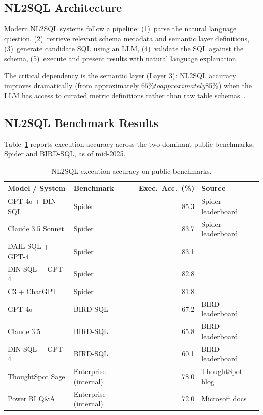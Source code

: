 \documentclass[12pt, a4paper]{article}
\begin{document}
\subsection{NL2SQL Architecture}
Modern NL2SQL systems follow a pipeline: (1)~parse the natural language question, (2)~retrieve relevant schema metadata and semantic layer definitions, (3)~generate candidate SQL using an LLM, (4)~validate the SQL against the schema, (5)~execute and present results with natural language explanation.

The critical dependency is the semantic layer (Layer 3): NL2SQL accuracy improves dramatically (from approximately $65\% to approximately $85\%) when the LLM has access to curated metric definitions rather than raw table schemas~\citep{gartner2024augmented}.

\subsection{NL2SQL Benchmark Results}
Table~\ref{tab:nl2sql-benchmarks} reports execution accuracy across the two dominant public benchmarks, Spider and BIRD-SQL, as of mid-2025.

\begin{table}[ht]
\centering\small
\caption{NL2SQL execution accuracy on public benchmarks.}
\label{tab:nl2sql-benchmarks}
\begin{tabular}{>{\raggedright\arraybackslash}p{4.2cm} l r >{\raggedright\arraybackslash}p{3.8cm}}
\toprule
\textbf{Model / System} & \textbf{Benchmark} & \textbf{Exec.~Acc.~(\%)} & \textbf{Source} \\
\midrule
GPT-4o + DIN-SQL        & Spider & 85.3 & Spider leaderboard \\
Claude 3.5 Sonnet       & Spider & 83.7 & Spider leaderboard \\
DAIL-SQL + GPT-4        & Spider & 83.1 & \citep{gao2023dailsql} \\
DIN-SQL + GPT-4         & Spider & 82.8 & \citep{pourreza2024dinsql} \\
C3 + ChatGPT            & Spider & 81.8 & \citep{dong2023c3} \\
\midrule
GPT-4o                  & BIRD-SQL & 67.2 & BIRD leaderboard \\
Claude 3.5              & BIRD-SQL & 65.8 & BIRD leaderboard \\
DIN-SQL + GPT-4         & BIRD-SQL & 60.1 & BIRD leaderboard \\
\midrule
ThoughtSpot Sage        & Enterprise (internal) & 78.0 & ThoughtSpot blog \\
Power BI Q\&A           & Enterprise (internal) & 72.0 & Microsoft docs \\
\bottomrule
\end{tabular}
\end{table}
\end{document}

